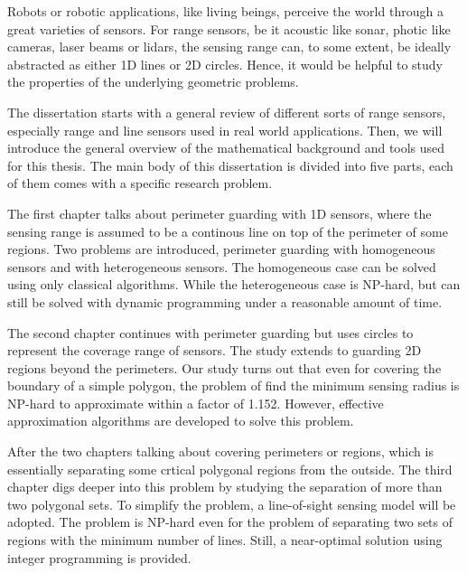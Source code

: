 \begin{my_abstract}

Robots or robotic applications, like living beings, perceive the world through
a great varieties of sensors.
For range sensors, be it acoustic like sonar, photic like cameras, laser beams or lidars, 
the sensing range can, to some extent, be ideally abstracted as either 1D lines or 2D circles.
Hence, it would be helpful to study the properties of the underlying geometric problems.

The dissertation starts with a general review of different sorts of range sensors, 
especially range and line sensors used in real world applications. 
Then, we will introduce the general overview of the mathematical background and tools used for this thesis. 
The main body of this dissertation is divided into five parts, each of them comes with 
a specific research problem. 

The first chapter talks about perimeter guarding with 1D sensors, where the sensing range 
is assumed to be a continous line on top of the perimeter of some regions. Two problems are 
introduced, perimeter guarding with homogeneous sensors and with heterogeneous sensors. 
The homogeneous case can be solved using only classical algorithms. 
While the heterogeneous case is NP-hard, but can still be solved with dynamic programming under a reasonable
amount of time. 

The second chapter continues with perimeter guarding but uses circles to represent the 
coverage range of sensors. The study extends to guarding 2D regions beyond the perimeters. 
Our study turns out that even for covering the boundary of a simple polygon, 
the problem of find the minimum sensing radius is NP-hard to approximate within a factor of 1.152. 
However, effective approximation algorithms are developed to solve this problem. 

After the two chapters talking about covering perimeters or regions, which is essentially separating 
some crtical polygonal regions from the outside. 
The third chapter digs deeper into this problem by studying the separation of more than two polygonal sets. 
To simplify the problem, a line-of-sight sensing model will be adopted. 
The problem is NP-hard even for the problem of separating two sets of regions with the minimum number of lines.
Still, a near-optimal solution using integer programming is provided.


\end{my_abstract}
